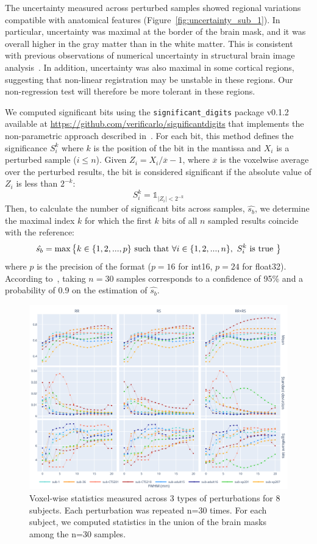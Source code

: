 \documentclass{article}
\begin{document}
The uncertainty measured across perturbed samples showed regional variations
compatible with anatomical features (Figure~\ref{fig:uncertainty_sub_1}). In
particular, uncertainty was maximal at the border of the brain mask, and it was
overall higher in the gray matter than in the white matter. This is consistent
with previous observations of numerical uncertainty in structural brain image
analysis~\cite{salari2021accurate}. In addition, uncertainty was also maximal in
some cortical regions, suggesting that non-linear registration may be unstable
in these regions. Our non-regression test will therefore be more tolerant in
these regions.

We computed significant bits using the \texttt{significant\_digits} package
v0.1.2 available at \url{https://github.com/verificarlo/significantdigits} that
implements the non-parametric approach described in~\cite{sohier2021confidence}.
For each bit, this method defines the significance $S^k_i$ where \(k\) is the
position of the bit in the mantissa and $X_i$ is a perturbed sample  ($i \leq
    n$). Given $Z_i=X_i/\overline{x}-1$, where $\overline{x}$ is the voxelwise average
over the perturbed results, the bit is considered significant if the absolute value of $Z_i$ is less
than $2^{-k}$:
\[S^k_i = \mathds{1}_{|Z_i |<2^{-k}}\] Then, to calculate the number of
significant bits across samples, $\hat{s_b}$, we determine the maximal index
\(k\) for which the first \(k\) bits of all \(n\) sampled results coincide with
the reference:
\[\hat{s_{b}} = \textnormal{max} \left\{ k \in \{1,2,...,p\} \textnormal{ such
        that } \forall i \in \{1,2,...,n\},\  S^{k}_{i} \textnormal{ is true } \right\} \]
where $p$ is the precision of the format ($p=16$ for int16, $p=24$ for float32).
According to~\cite{sohier2021confidence}, taking $n=30$ samples
corresponds to a confidence of 95\% and a probability of 0.9 on the estimation of $\hat{s_b}$.

\begin{figure}
    \centering
    \includegraphics[width=\linewidth]{figures/stats.pdf}
    \caption{Voxel-wise statistics measured across 3 types of perturbations for 8 subjects. Each perturbation was repeated n=30 times. For each subject, we computed statistics in the union of the brain masks among the n=30 samples.}
    \label{fig:numerical-uncertainty}
\end{figure}
\end{document}
